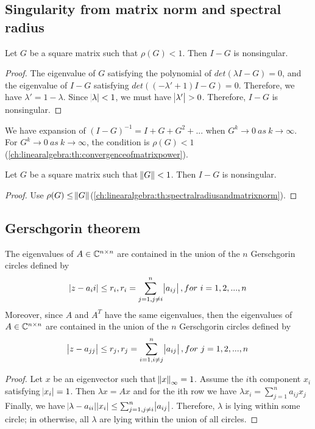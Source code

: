 \begin{refsection}
\subsection{Singularity from matrix norm and spectral radius}
\begin{theorem}\label{ch:linearalgebra:singularityfromspectralradius}
Let $G$ be a square matrix such that $\rho(G) < 1$. Then $I-G$ is nonsingular.
\end{theorem}
\begin{proof}
The eigenvalue of $G$ satisfying the polynomial of $det(\lambda I - G) = 0$, and the eigenvalue of $I-G$ satisfying $det((-\lambda' + 1)I - G) = 0$. Therefore, we have
$\lambda' = 1 - \lambda $. Since $\abs{\lambda} < 1$, we must have $\abs{\lambda'} > 0$. Therefore, $I-G$ is nonsingular.
\end{proof}

\begin{remark}[interpretation]
We have expansion of $(I-G)^{-1} = I + G + G^2 + ...$ when $G^k \to 0 ~as~ k\to \infty$. For $G^k \to 0 ~as~ k\to \infty$, the condition is $\rho(G) < 1$(\autoref{ch:linearalgebra:th:convergenceofmatrixpower}).
\end{remark}


\begin{corollary}
Let $G$ be a square matrix such that $\norm{G} < 1$. Then $I-G$ is nonsingular.	
\end{corollary}
\begin{proof}
Use $\rho(G) \leq \norm{G}$(\autoref{ch:linearalgebra:th:spectralradiusandmatrixnorm}). 
\end{proof}



\subsection{Gerschgorin theorem}
\begin{theorem}\cite[498]{meyer2000matrix}\cite[16]{varga2009matrix}\cite[120]{saad2003iterative}\label{ch:linearalgebra:th:Gerschgorintheorem}
The eigenvalues of $A\in \mathbb{C}^{n\times n}$ are contained in the union of the $n$ Gerschgorin circles defined by 
$$\abs{z - a_ii} \leq r_i, r_i = \sum_{j=1,j\neq i}^n \abs{a_{ij}}, for ~ i=1,2,...,n$$
Moreover, since $A$ and $A^T$ have the same eigenvalues, then
the eigenvalues of $A\in \mathbb{C}^{n\times n}$ are contained in the union of the $n$ Gerschgorin circles defined by 
$$\abs{z - a_{jj}} \leq r_j, r_j = \sum_{i=1,i\neq j}^n \abs{a_{ij}}, for ~ j=1,2,...,n$$
\end{theorem}
\begin{proof}
	Let $x$ be an eigenvector such that $\norm{x}_\infty = 1$. Assume the $i$th component $x_i$ satisfying $\abs{x_i} = 1$. Then
	$\lambda x = Ax$ and for the ith row we have $\lambda x_i = \sum_{j=1}^n a_{ij}x_j $
	Finally, we have
	$\abs{\lambda - a_{ii}}\abs{x_i} \leq \sum_{j=1,j\neq i}^n \abs{a_{ij}}$.
	Therefore, $\lambda$ is lying within some circle; in otherwise, all $\lambda$ are lying within the union of all circles.
\end{proof}



\end{refsection}
